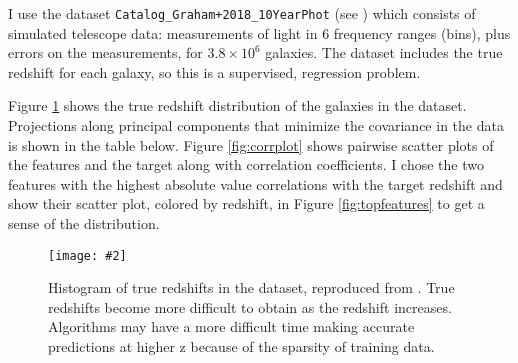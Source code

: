 \documentclass[13pt]{amsart}
\newcommand{\figscale}[4]{
\begin{figure}[ht]
    \centering
    \caption{#3}
    \label{#4}
    \texttt{[image: \#2]}
\end{figure}
}
\begin{document}
    I use the dataset \texttt{Catalog\_Graham+2018\_10YearPhot} (see \cite{graham}) which consists of simulated telescope data: measurements of light in 6 frequency ranges (bins), plus errors on the measurements, for $3.8 \times 10^6$ galaxies. The dataset includes the true redshift for each galaxy, so this is a supervised, regression problem.

    Figure \ref{fig:zdist} shows the true redshift distribution of the galaxies in the dataset. Projections along principal components that minimize the covariance in the data is shown in the table below. Figure \ref{fig:corrplot} shows pairwise scatter plots of the features and the target along with correlation coefficients. I chose the two features with the highest absolute value correlations with the target redshift and show their scatter plot, colored by redshift, in Figure \ref{fig:topfeatures} to get a sense of the distribution.

    \figscale{0.6}{../plots/figure_true_redshift_histogram.png}{Histogram of true redshifts in the dataset, reproduced from \cite{graham}. True redshifts become more difficult to obtain as the redshift increases. Algorithms may have a more difficult time making accurate predictions at higher z because of the sparsity of training data.}{fig:zdist}

\end{document}
